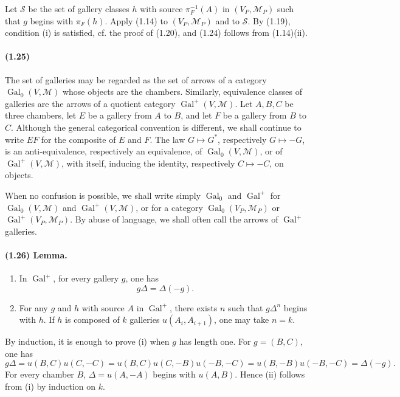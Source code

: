\documentclass[10pt]{article}
\begin{document}
Let \(\mathcal S\) be the set of gallery classes \(h\) with source \(\pi_F^{-1}(A)\) in \((V_P,\mathcal M_P)\) such that \(g\) begins with \(\pi_F(h)\). Apply (1.14) to \((V_P,\mathcal M_P)\) and to \(\mathcal S\). By (1.19), condition (i) is satisfied, cf. the proof of (1.20), and (1.24) follows from (1.14)(ii).

\paragraph{(1.25)} The set of galleries may be regarded as the set of arrows of a category \(\operatorname{Gal}_0(V,\mathcal M)\) whose objects are the chambers. Similarly, equivalence classes of galleries are the arrows of a quotient category \(\operatorname{Gal}^+(V,\mathcal M)\). Let \(A,B,C\) be three chambers, let \(E\) be a gallery from \(A\) to \(B\), and let \(F\) be a gallery from \(B\) to \(C\). Although the general categorical convention is different, we shall continue to write \(EF\) for the composite of \(E\) and \(F\). The law \(G\mapsto G^*\), respectively \(G\mapsto -G\), is an anti-equivalence, respectively an equivalence, of \(\operatorname{Gal}_0(V,\mathcal M)\), or of \(\operatorname{Gal}^+(V,\mathcal M)\), with itself, inducing the identity, respectively \(C\mapsto -C\), on objects.

When no confusion is possible, we shall write simply \(\operatorname{Gal}_0\) and \(\operatorname{Gal}^+\) for \(\operatorname{Gal}_0(V,\mathcal M)\) and \(\operatorname{Gal}^+(V,\mathcal M)\), or for a category \(\operatorname{Gal}_0(V_P,\mathcal M_P)\) or \(\operatorname{Gal}^+(V_P,\mathcal M_P)\). By abuse of language, we shall often call the arrows of \(\operatorname{Gal}^+\) galleries.

\paragraph{(1.26) Lemma.}
\begin{enumerate}[label=(\roman*)]
\item In \(\operatorname{Gal}^+\), for every gallery \(g\), one has
\[
g\Delta=\Delta(-g).
\]
\item For any \(g\) and \(h\) with source \(A\) in \(\operatorname{Gal}^+\), there exists \(n\) such that \(g\Delta^n\) begins with \(h\). If \(h\) is composed of \(k\) galleries \(u(A_i,A_{i+1})\), one may take \(n=k\).
\end{enumerate}

By induction, it is enough to prove (i) when \(g\) has length one. For \(g=(B,C)\), one has
\[
g\Delta=u(B,C)u(C,-C)=u(B,C)u(C,-B)u(-B,-C)
=u(B,-B)u(-B,-C)=\Delta(-g).
\]
For every chamber \(B\), \(\Delta=u(A,-A)\) begins with \(u(A,B)\). Hence (ii) follows from (i) by induction on \(k\).
\end{document}

